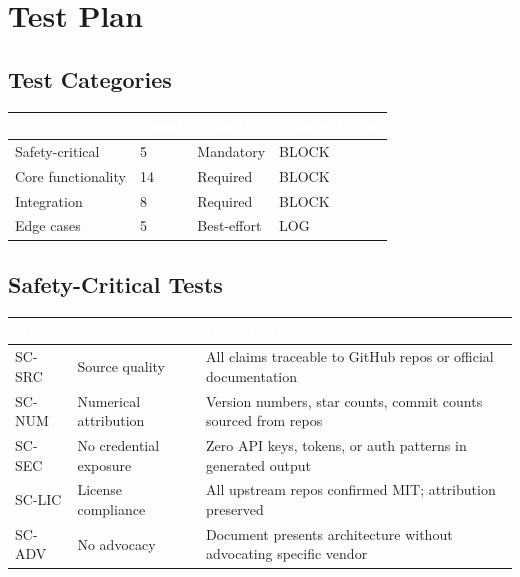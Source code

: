 \documentclass[11pt,letterpaper]{article}
\newcommand{\tableheader}[1]{\textbf{\sffamily\textcolor{white}{#1}}}
\begin{document}
\section{Test Plan}

\subsection{Test Categories}

\begin{center}
\begin{tabularx}{\textwidth}{L{3cm}C{1.5cm}C{1.5cm}C{2cm}}
\toprule
{}
\tableheader{Category} & \tableheader{Count} & \tableheader{Priority} & \tableheader{Failure Action} \\
\midrule
Safety-critical & 5 & Mandatory & BLOCK \\
Core functionality & 14 & Required & BLOCK \\
Integration & 8 & Required & BLOCK \\
Edge cases & 5 & Best-effort & LOG \\
\bottomrule
\end{tabularx}
\end{center}

\subsection{Safety-Critical Tests}

\begin{center}
\begin{tabularx}{\textwidth}{C{1.2cm}L{4cm}X}
\toprule
{}
\tableheader{ID} & \tableheader{Verifies} & \tableheader{Expected Behavior} \\
\midrule
SC-SRC & Source quality & All claims traceable to GitHub repos or official documentation \\
SC-NUM & Numerical attribution & Version numbers, star counts, commit counts sourced from repos \\
SC-SEC & No credential exposure & Zero API keys, tokens, or auth patterns in generated output \\
SC-LIC & License compliance & All upstream repos confirmed MIT; attribution preserved \\
SC-ADV & No advocacy & Document presents architecture without advocating specific vendor \\
\bottomrule
\end{tabularx}
\end{center}
\end{document}
